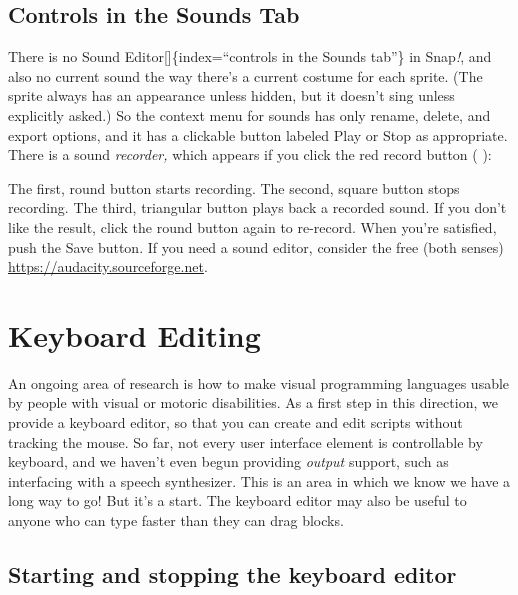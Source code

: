 \documentclass[
  letterpaper,
]{book}
\begin{document}
\subsection{}\label{section-3}

\subsection{Controls in the Sounds
Tab}\label{controls-in-the-sounds-tab}

There is no Sound Editor{[}{]}\{index=``controls in the Sounds tab''\}
in Snap\emph{!}, and also no current sound the way there's a current
costume for each sprite. (The sprite always has an appearance unless
hidden, but it doesn't sing unless explicitly asked.) So the context
menu for sounds has only rename, delete, and export options, and it has
a clickable button labeled Play or Stop as appropriate. There is a sound
\emph{recorder,} which appears if you click the red record button ( ):

The first, round button starts recording. The second, square button
stops recording. The third, triangular button plays back a recorded
sound. If you don't like the result, click the round button again to
re-record. When you're satisfied, push the Save button. If you need a
sound editor, consider the free (both senses)
\href{http://audacity.sourceforge.net}{https://audacity.sourceforge.net}.

\section{Keyboard Editing}\label{keyboard-editing}

An ongoing area of research is how to make visual programming languages
usable by people with visual or motoric disabilities. As a first step in
this direction, we provide a keyboard editor, so that you can create and
edit scripts without tracking the mouse. So far, not every user
interface element is controllable by keyboard, and we haven't even begun
providing \emph{output} support, such as interfacing with a speech
synthesizer. This is an area in which we know we have a long way to go!
But it's a start. The keyboard editor may also be useful to anyone who
can type faster than they can drag blocks.

\subsection{Starting and stopping the keyboard
editor}\label{starting-and-stopping-the-keyboard-editor}
\end{document}
